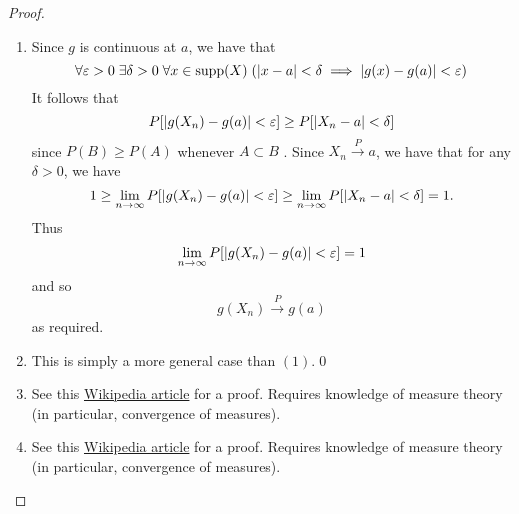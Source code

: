 \documentclass[notoc,notitlepage]{tufte-book}
\DeclareMathOperator{\supp}{supp }
\newcommand{\convp}{\overset{P}{\to}}
\begin{document}
\begin{proof}
  \begin{enumerate}
    \item Since $g$ is continuous at $a$, we have that
      \begin{equation*}
        \forall \epsilon > 0 \; \exists \delta > 0 \; \forall x \in \supp(X) \; ( \abs{x -a} < \delta \implies \abs{g(x) - g(a)} < \epsilon )
      \end{equation*}
      It follows that
      \begin{equation*}
        P[ \left| g(X_n ) - g(a)\right| < \varepsilon ] \geq P[ \left|X_n - a\right| < \delta ]
      \end{equation*}
      since $P(B) \geq P(A)$ whenever $A \subset B$ . Since $X_n \convp a$, we have that for any $\delta > 0$, we have
      \begin{equation*}
        1 \geq \lim_{n \to \infty} P[ \left|g(X_n) - g(a)\right| < \varepsilon ] \geq \lim_{n \to \infty} P[ \left|X_n - a\right| < \delta ] = 1.
      \end{equation*}
      Thus
      \begin{equation*}
        \lim_{n \to \infty} P[ \left|g(X_n) - g(a)\right| < \varepsilon ] = 1
      \end{equation*}
      and so
      \begin{equation*}
        g(X_n) \convp g(a)
      \end{equation*}
      as required.

    \item This is simply a more general case than $(1)$.\qed

    \item See this \href{https://en.wikipedia.org/wiki/Slutsky\'s_theorem}{Wikipedia article} for a proof. Requires knowledge of measure theory (in particular, convergence of measures).
      
    \item See this \href{https://en.wikipedia.org/wiki/Continuous_mapping_theorem}{Wikipedia article} for a proof. Requires knowledge of measure theory (in particular, convergence of measures).
  \end{enumerate}
\end{proof}
\end{document}

